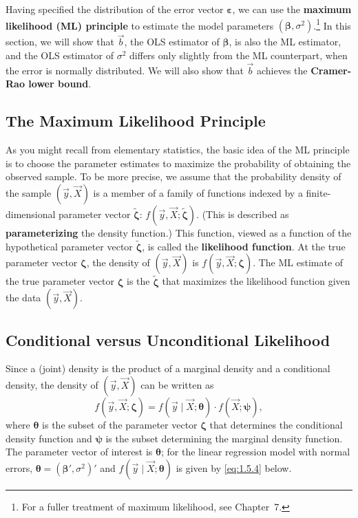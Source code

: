 
Having specified the distribution of the error vector $\bm{\varepsilon}$, we can use the
\textbf{maximum likelihood (ML) principle} to estimate the model parameters
$(\bm{\beta}, \sigma^2)$.\footnote{For a fuller treatment of maximum likelihood, see Chapter~7.}
In this section, we will show that $\vec{b}$, the OLS estimator of $\bm{\beta}$, is also the
ML estimator, and the OLS estimator of $\sigma^2$ differs only slightly from the ML
counterpart, when the error is normally distributed.  We will also show that $\vec{b}$
achieves the \textbf{Cramer-Rao lower bound}.

\subsection*{The Maximum Likelihood Principle}

As you might recall from elementary statistics, the basic idea of the ML principle is to
choose the parameter estimates to maximize the probability of obtaining the observed
sample.  To be more precise, we assume that the probability density of the sample
$(\vec{y}, \vec{X})$ is a member of a family of functions indexed by a finite-dimensional
parameter vector $\tilde{\bm{\zeta}}$: $f(\vec{y}, \vec{X}; \tilde{\bm{\zeta}})$.
(This is described as \textbf{parameterizing} the density function.)  This function, viewed
as a function of the hypothetical parameter vector $\tilde{\bm{\zeta}}$, is called the
\textbf{likelihood function}.  At the true parameter vector $\bm{\zeta}$, the density of
$(\vec{y}, \vec{X})$ is $f(\vec{y}, \vec{X}; \bm{\zeta})$.  The ML estimate of the true
parameter vector $\bm{\zeta}$ is the $\tilde{\bm{\zeta}}$ that maximizes the likelihood
function given the data $(\vec{y}, \vec{X})$.

\subsection*{Conditional versus Unconditional Likelihood}

Since a (joint) density is the product of a marginal density and a conditional density,
the density of $(\vec{y}, \vec{X})$ can be written as
%
\begin{equation}
  f(\vec{y}, \vec{X}; \bm{\zeta})
    = f(\vec{y} \mid \vec{X}; \bm{\theta}) \cdot f(\vec{X}; \bm{\psi}),
  \label{eq:1.5.1}
\end{equation}
%
where $\bm{\theta}$ is the subset of the parameter vector $\bm{\zeta}$ that determines the
conditional density function and $\bm{\psi}$ is the subset determining the marginal density
function.  The parameter vector of interest is $\bm{\theta}$; for the linear regression model
with normal errors, $\bm{\theta} = (\bm{\beta}', \sigma^2)'$ and $f(\vec{y} \mid \vec{X};
\bm{\theta})$ is given by \eqref{eq:1.5.4} below.

